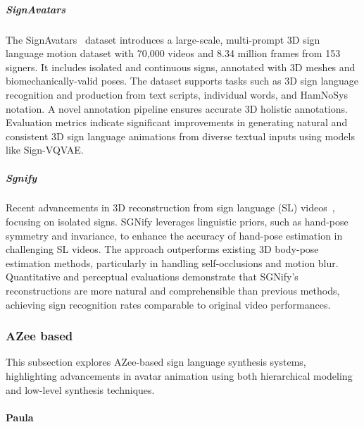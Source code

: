 \documentclass[../../main.tex]{subfiles}
\begin{document}
\subparagraph{SignAvatars}
\label{ch:background_work:sign_language_synthesis:3d_techniques:sign_language_synthesis_systems:synthesis_based_on_generative_models:signavatars}

The SignAvatars~\cite{yu2023signavatars} dataset introduces a large-scale, multi-prompt 3D sign language motion dataset with 70,000 videos and 8.34 million frames from 153 signers. It includes isolated and continuous signs, annotated with 3D meshes and biomechanically-valid poses. The dataset supports tasks such as 3D sign language recognition and production from text scripts, individual words, and HamNoSys notation. A novel annotation pipeline ensures accurate 3D holistic annotations. Evaluation metrics indicate significant improvements in generating natural and consistent 3D sign language animations from diverse textual inputs using models like Sign-VQVAE.

\subparagraph{Sgnify}
\label{ch:background_work:sign_language_synthesis:3d_techniques:sign_language_synthesis_systems:synthesis_based_on_generative_models:sgnify}

Recent advancements in 3D reconstruction from sign language (SL) videos~\cite{Forte_2023_CVPR}, focusing on isolated signs. SGNify leverages linguistic priors, such as hand-pose symmetry and invariance, to enhance the accuracy of hand-pose estimation in challenging SL videos. The approach outperforms existing 3D body-pose estimation methods, particularly in handling self-occlusions and motion blur. Quantitative and perceptual evaluations demonstrate that SGNify's reconstructions are more natural and comprehensible than previous methods, achieving sign recognition rates comparable to original video performances.

\subsubsection{AZee based}
\label{ch:background_work:sign_language_synthesis:3d_techniques:sign_language_synthesis_systems:azee_based}

This subsection explores AZee-based sign language synthesis systems, highlighting advancements in avatar animation using both hierarchical modeling and low-level synthesis techniques.

\paragraph{Paula}
\label{ch:background_work:sign_language_synthesis:3d_techniques:sign_language_synthesis_systems:azee_based:paula}
\end{document}
